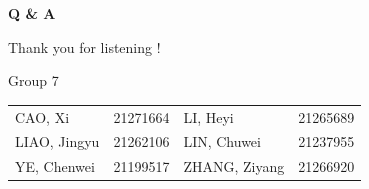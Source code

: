 \documentclass[serif, aspectratio=169]{beamer}
\begin{document}
\begin{frame}
    \huge
    \begin{center}
        \textbf{Q \& A}
    \end{center}
\end{frame}


\begin{frame}

\begin{center}
{ 
    \huge
    Thank you for listening !
    \normalsize
}
\vspace{1cm}

Group 7 \\[3em]

\scriptsize
\begin{tabular}{llll}
    \toprule
    CAO, Xi & 21271664 & LI, Heyi & 21265689  \\
    LIAO, Jingyu & 21262106 & LIN, Chuwei & 21237955  \\
    YE, Chenwei & 21199517 & ZHANG, Ziyang & 21266920  \\
    \bottomrule
\end{tabular}
\normalsize
\end{center}
\end{frame}
\end{document}
